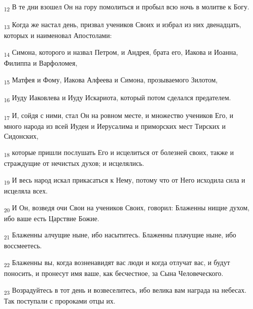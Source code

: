 \begin{tcolorbox}
\textsubscript{12} В те дни взошел Он на гору помолиться и пробыл всю ночь в молитве к Богу.
\end{tcolorbox}
\begin{tcolorbox}
\textsubscript{13} Когда же настал день, призвал учеников Своих и избрал из них двенадцать, которых и наименовал Апостолами:
\end{tcolorbox}
\begin{tcolorbox}
\textsubscript{14} Симона, которого и назвал Петром, и Андрея, брата его, Иакова и Иоанна, Филиппа и Варфоломея,
\end{tcolorbox}
\begin{tcolorbox}
\textsubscript{15} Матфея и Фому, Иакова Алфеева и Симона, прозываемого Зилотом,
\end{tcolorbox}
\begin{tcolorbox}
\textsubscript{16} Иуду Иаковлева и Иуду Искариота, который потом сделался предателем.
\end{tcolorbox}
\begin{tcolorbox}
\textsubscript{17} И, сойдя с ними, стал Он на ровном месте, и множество учеников Его, и много народа из всей Иудеи и Иерусалима и приморских мест Тирских и Сидонских,
\end{tcolorbox}
\begin{tcolorbox}
\textsubscript{18} которые пришли послушать Его и исцелиться от болезней своих, также и страждущие от нечистых духов; и исцелялись.
\end{tcolorbox}
\begin{tcolorbox}
\textsubscript{19} И весь народ искал прикасаться к Нему, потому что от Него исходила сила и исцеляла всех.
\end{tcolorbox}
\begin{tcolorbox}
\textsubscript{20} И Он, возведя очи Свои на учеников Своих, говорил: Блаженны нищие духом, ибо ваше есть Царствие Божие.
\end{tcolorbox}
\begin{tcolorbox}
\textsubscript{21} Блаженны алчущие ныне, ибо насытитесь. Блаженны плачущие ныне, ибо воссмеетесь.
\end{tcolorbox}
\begin{tcolorbox}
\textsubscript{22} Блаженны вы, когда возненавидят вас люди и когда отлучат вас, и будут поносить, и пронесут имя ваше, как бесчестное, за Сына Человеческого.
\end{tcolorbox}
\begin{tcolorbox}
\textsubscript{23} Возрадуйтесь в тот день и возвеселитесь, ибо велика вам награда на небесах. Так поступали с пророками отцы их.
\end{tcolorbox}
